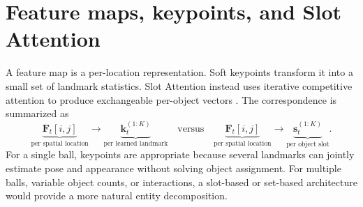 \documentclass[11pt,a4paper]{article}
\begin{document}
\section{Feature maps, keypoints, and Slot Attention}
A feature map is a per-location representation. Soft keypoints transform it into a small set of landmark statistics. Slot Attention instead uses iterative competitive attention to produce exchangeable per-object vectors \cite{locatello2020slot}. The correspondence is summarized as
\begin{equation}
\underbrace{\bm F_t[i,j]}_{\text{per spatial location}}
\longrightarrow
\underbrace{\bm k_t^{(1:K)}}_{\text{per learned landmark}}
\quad\text{versus}\quad
\underbrace{\bm F_t[i,j]}_{\text{per spatial location}}
\longrightarrow
\underbrace{\bm s_t^{(1:K)}}_{\text{per object slot}}.
\end{equation}
For a single ball, keypoints are appropriate because several landmarks can jointly estimate pose and appearance without solving object assignment. For multiple balls, variable object counts, or interactions, a slot-based or set-based architecture would provide a more natural entity decomposition.
\end{document}
